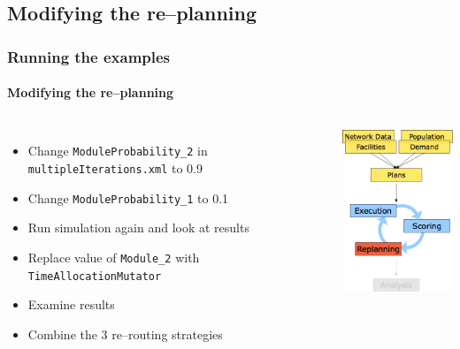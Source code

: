 \subsection{Modifying the re--planning}

\begin{frame}[fragile]
\frametitle{Running the examples}
\framesubtitle{Modifying the re--planning}

\begin{columns}[T]

\column{7cm}

\begin{itemize}
  \item Change \verb|ModuleProbability_2| in \verb|multipleIterations.xml| to 0.9
  \item Change \verb|ModuleProbability_1| to 0.1
  \item Run simulation again and look at results
  \item Replace value of \verb|Module_2| with \verb|TimeAllocationMutator|
  \item Examine results
  \item Combine the 3 re--routing strategies
\end{itemize}

\column{5cm}
\includegraphics[width=4cm]{../graphics/overviewMatsimReplanning.png}

\end{columns}

\end{frame}
